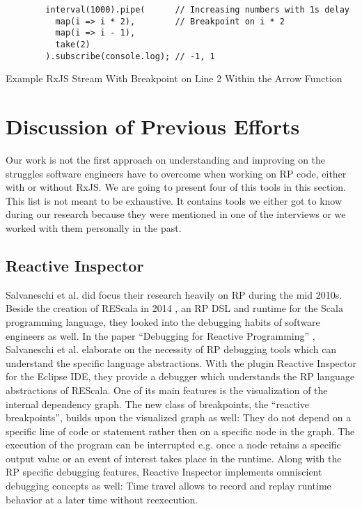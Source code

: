 \documentclass[12pt,a4paper]{article}
\begin{document}
\begin{listing}[H]
	\begin{verbatim}
		interval(1000).pipe(      // Increasing numbers with 1s delay
		  map(i => i * 2),        // Breakpoint on i * 2
		  map(i => i - 1),
		  take(2)
		).subscribe(console.log); // -1, 1
	\end{verbatim}
	\caption{Example RxJS Stream With Breakpoint on Line 2 Within the Arrow Function}
	\label{lst:rxjs-step-controls}
\end{listing}


\section{Discussion of Previous Efforts}
\label{sec:discussion}

Our work is not the first approach on understanding and improving on the struggles software engineers have to overcome when working on RP code, either with or without RxJS. We are going to present four of this tools in this section. This list is not meant to be exhaustive. It contains tools we either got to know during our research because they were mentioned in one of the interviews or we worked with them personally in the past.

\subsection{Reactive Inspector}

Salvaneschi et al. did focus their research heavily on RP during the mid 2010s. Beside the creation of REScala in 2014 \cite{10.1145/2577080.2577083}, an RP DSL and runtime for the Scala programming language, they looked into the debugging habits of software engineers as well. In the paper ``Debugging for Reactive Programming'' \cite{10.1145/2884781.2884815}, Salvaneschi et al. elaborate on the necessity of RP debugging tools which can understand the specific language abstractions. With the plugin Reactive Inspector for the Eclipse IDE, they provide a debugger which understands the RP language abstractions of REScala. One of its main features is the visualization of the internal dependency graph. The new class of  breakpoints, the ``reactive breakpoints'', builds upon the visualized graph as well: They do not depend on a specific line of code or statement rather then on a specific node in the graph. The execution of the program can be interrupted e.g. once a node retains a specific output value or an event of interest takes place in the runtime. Along with the RP specific debugging features, Reactive Inspector implements omniscient debugging concepts as well: Time travel allows to record and replay runtime behavior at a later time without reexecution.
\end{document}
